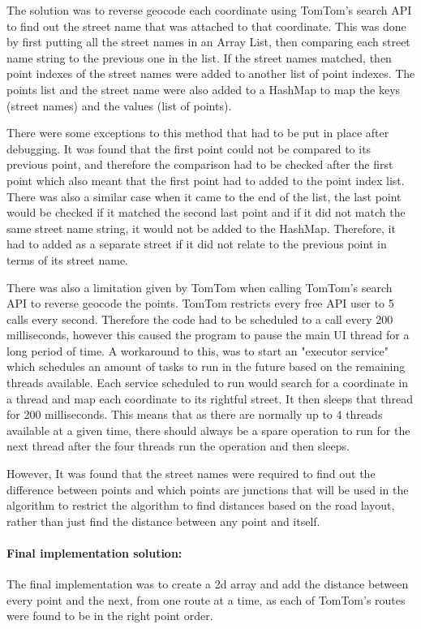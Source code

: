 \documentclass[12pt,a4paper]{article}
\begin{document}
The solution was to reverse geocode each coordinate using TomTom’s search API to find out the street name that was attached to that coordinate. This was done by first putting all the street names in an Array List, then comparing each street name string to the previous one in the list. If the street names matched, then point indexes of the street names were added to another list of point indexes. The points list and the street name were also added to a HashMap to map the keys (street names) and the values (list of points).

There were some exceptions to this method that had to be put in place after debugging. It was found that the first point could not be compared to its previous point, and therefore the comparison had to be checked after the first point which also meant that the first point had to added to the point index list. There was also a similar case when it came to the end of the list, the last point would be checked if it matched the second last point and if it did not match the same street name string, it would not be added to the HashMap. Therefore, it had to added as a separate street if it did not relate to the previous point in terms of its street name.

There was also a limitation given by TomTom when calling TomTom's search API to reverse geocode the points. TomTom restricts every free API user to 5 calls every second. Therefore the code had to be scheduled to a call every 200 milliseconds, however this caused the program to pause the main UI thread for a long period of time. A workaround to this, was to start an "executor service" which schedules an amount of tasks to run in the future based on the remaining threads available. Each service scheduled to run would search for a coordinate in a thread and map each coordinate to its rightful street. It then sleeps that thread for 200 milliseconds. This means that as there are normally up to 4 threads available at a given time, there should always be a spare operation to run for the next thread after the four threads run the operation and then sleeps. 

However, It was found that the street names were required to find out the difference between points and which points are junctions that will be used in the algorithm to restrict the algorithm to find distances based on the road layout, rather than just find the distance between any point and itself.

\paragraph{Final implementation solution:}
The final implementation was to create a 2d array and add the distance between every point and the next, from one route at a time, as each of TomTom's routes were found to be in the right point order. 
\end{document}
